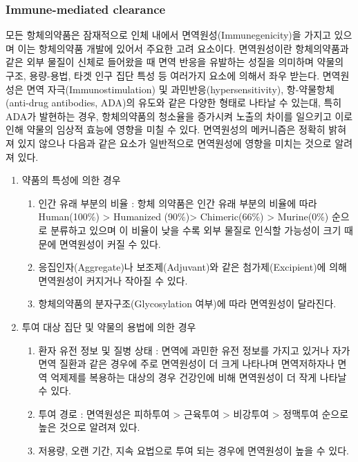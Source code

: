 \documentclass[
  11pt,
  krantz2, a4paper, twoside]{krantz}
\providecommand{\tightlist}{%
  \setlength{\itemsep}{0pt}\setlength{\parskip}{0pt}}
\theoremstyle{definition}
\theoremstyle{definition}
\theoremstyle{definition}
\theoremstyle{definition}
\theoremstyle{remark}
\begin{document}
\subsubsection{Immune-mediated clearance}\label{ADA}

모든 항체의약품은 잠재적으로 인체 내에서 면역원성(Immunegenicity)을 가지고 있으며 이는 항체의약품 개발에 있어서 주요한 고려 요소이다.  면역원성이란 항체의약품과 같은 외부 물질이 신체로 들어왔을 때 면역 반응을 유발하는 성질을 의미하며 약물의 구조, 용량-용법, 타겟 인구 집단 특성 등 여러가지 요소에 의해서 좌우 받는다.  면역원성은 면역 자극(Immunostimulation) 및 과민반응(hypersensitivity), 항-약물항체(anti-drug antibodies, ADA)의 유도와 같은 다양한 형태로 나타날 수 있는대, 특히 ADA가 발현하는 경우, 항체의약품의 청소율을 증가시켜 노출의 차이를 일으키고 이로인해 약물의 임상적 효능에 영향을 미칠 수 있다.   면역원성의 메커니즘은 정확히 밝혀져 있지 않으나 다음과 같은 요소가 일반적으로 면역원성에 영향을 미치는 것으로 알려져 있다. 

\begin{enumerate}
\def\labelenumi{\arabic{enumi})}
\tightlist
\item
  약품의 특성에 의한 경우

  \begin{enumerate}
  \def\labelenumii{\arabic{enumii})}
  \tightlist
  \item
    인간 유래 부분의 비율 : 항체 의약품은 인간 유래 부분의 비율에 따라 Human(100\%) \textgreater{} Humanized (90\%)\textgreater{} Chimeric(66\%) \textgreater{} Murine(0\%) 순으로 분류하고 있으며 이 비율이 낮을 수록 외부 물질로 인식할 가능성이 크기 때문에 면역원성이 커질 수 있다.
  \item
    응집인자(Aggregate)나 보조제(Adjuvant)와 같은 첨가제(Excipient)에 의해 면역원성이 커지거나 작아질 수 있다.
  \item
    항체의약품의 분자구조(Glycosylation 여부)에 따라 면역원성이 달라진다.
  \end{enumerate}
\item
  투여 대상 집단 및 약물의 용법에 의한 경우

  \begin{enumerate}
  \def\labelenumii{\arabic{enumii})}
  \tightlist
  \item
    환자 유전 정보 및 질병 상태 : 면역에 과민한 유전 정보를 가지고 있거나 자가면역 질환과 같은 경우에 주로 면역원성이 더 크게 나타나며 면역저하자나 면역 억제제를 복용하는 대상의 경우 건강인에 비해 면역원성이 더 작게 나타날 수 있다.
  \item
    투여 경로 : 면역원성은 피하투여 \textgreater{} 근육투여 \textgreater{} 비강투여 \textgreater{} 정맥투여 순으로 높은 것으로 알려져 있다.
  \item
    저용량, 오랜 기간, 지속 요법으로 투여 되는 경우에 면역원성이 높을 수 있다.
  \end{enumerate}
\end{enumerate}
\end{document}
